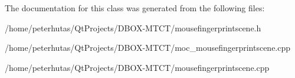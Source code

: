 The documentation for this class was generated from the following files\+:\begin{DoxyCompactItemize}
\item 
/home/peterhutas/\+Qt\+Projects/\+D\+B\+O\+X-\/\+M\+T\+C\+T/mousefingerprintscene.\+h\item 
/home/peterhutas/\+Qt\+Projects/\+D\+B\+O\+X-\/\+M\+T\+C\+T/moc\+\_\+mousefingerprintscene.\+cpp\item 
/home/peterhutas/\+Qt\+Projects/\+D\+B\+O\+X-\/\+M\+T\+C\+T/mousefingerprintscene.\+cpp\end{DoxyCompactItemize}
